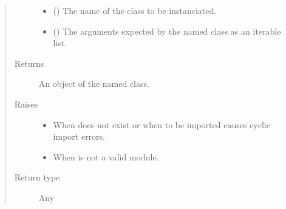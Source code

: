 \documentclass[letterpaper,10pt,english]{sphinxmanual}
\begin{document}
\begin{fulllineitems}
\begin{quote}
\begin{description}
\begin{itemize}
\item {} 
 () \textendash{} The name of the class to be instanciated.

\item {} 
 (\sphinxstyleliteralemphasis{\sphinxupquote{{[}}}\sphinxstyleliteralemphasis{\sphinxupquote{{]}}}) \textendash{} The arguments expected by the named class as an iterable list.

\end{itemize}

\item[{Returns}] \leavevmode
An object of the named class.

\item[{Raises}] \leavevmode\begin{itemize}
\item {} 
 \textendash{} When  does not exist or when  to be
    imported causes cyclic import errors.

\item {} 
 \textendash{} When  is not a valid module.

\end{itemize}

\item[{Return type}] \leavevmode
Any

\end{description}\end{quote}

\end{fulllineitems}

\end{document}
